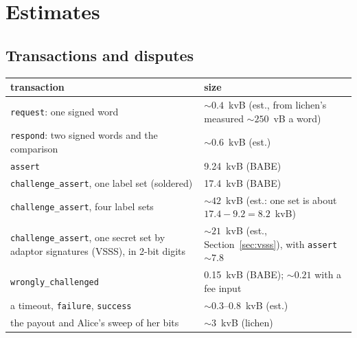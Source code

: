 \documentclass[11pt]{article}
\newcommand{\tx}[1]{\texttt{#1}}
\begin{document}
\section{Estimates}
\label{sec:costs}

\subsection{Transactions and disputes}

\begin{center}
\small
\begin{tabularx}{\linewidth}{>{\raggedright\arraybackslash}p{60mm}L}
\toprule
transaction & size \\
\midrule
\tx{request}: one signed word & ${\sim}0.4$~kvB (est., from lichen's measured ${\sim}250$~vB a word) \\
\tx{respond}: two signed words and the comparison & ${\sim}0.6$~kvB (est.) \\
\tx{assert} & 9.24~kvB (BABE) \\
\tx{challenge\_assert}, one label set (soldered) & 17.4~kvB (BABE) \\
\tx{challenge\_assert}, four label sets & ${\sim}42$~kvB (est.: one set is about $17.4 - 9.2 = 8.2$~kvB) \\
\tx{challenge\_assert}, one secret set by adaptor signatures (VSSS), in 2-bit digits & ${\sim}21$~kvB (est., Section~\ref{sec:vsss}), with \tx{assert} ${\sim}7.8$ \\
\tx{wrongly\_challenged} & 0.15~kvB (BABE); ${\sim}0.21$ with a fee input \\
a timeout, \tx{failure}, \tx{success} & ${\sim}0.3$--$0.8$~kvB (est.) \\
the payout and Alice's sweep of her bits & ${\sim}3$~kvB (lichen) \\
\bottomrule
\end{tabularx}
\end{center}
\end{document}

